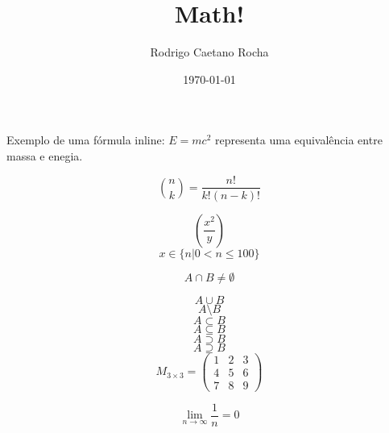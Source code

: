 \documentclass[a4paper,12pt]{article}
\title{Math!}
\author{Rodrigo Caetano Rocha}
\date{\today}
\begin{document}
\maketitle

Exemplo de uma fórmula inline: $E=mc^2$ representa uma equivalência entre massa e enegia.

\[
\binom{n}{k} = \frac{n!}{k!(n-k)!}
\]

\[
  \left(\frac{x^2}{y}\right)
\]
\[
   x\in \{ n | 0 < n \leq 100 \}
\]

\[
   A \cap B \neq \emptyset
\]

\[
   A \cup B
\]
\[
   A \setminus B
\]
\[
   A \subset B
\]
\[
   A \subseteq B
\]
\[
   A \supset B
\]
\[
   A \supseteq B
\]
\[
M_{3\times 3} = 
\begin{pmatrix}
1 & 2 & 3\\
4 & 5 & 6\\
7 & 8 & 9
\end{pmatrix}
\]

\[
\lim_{n \to \infty} \frac{1}{n} = 0
\]
\end{document}
